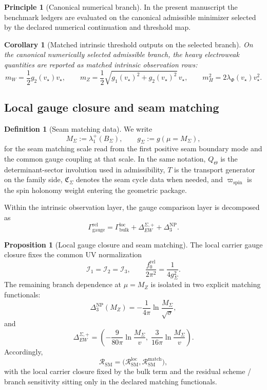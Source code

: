 \documentclass[11pt,a4paper]{article}
\newtheorem{corollary}[theorem]{Corollary}
\theoremstyle{definition}
\newtheorem{definition}[theorem]{Definition}
\newtheorem{proposition}[theorem]{Proposition}
\newtheorem{principle}[theorem]{Principle}
\theoremstyle{remark}
\newcommand{\Seam}{\Sigma}
\newcommand{\SM}{\mathrm{SM}}
\newcommand{\wspin}{\varpi_{\mathrm{spin}}}
\begin{document}
\begin{principle}[Canonical numerical branch]
In the present manuscript the benchmark ledgers are evaluated on the canonical admissible
minimizer selected by the declared numerical continuation and threshold map.
\end{principle}

\begin{corollary}[Matched intrinsic threshold outputs on the selected branch]
\label{cor:intrinsic-threshold-outputs}
On the canonical numerically selected admissible branch, the heavy electroweak quantities are
reported as matched intrinsic observation rows:
\[
m_W=\frac12 g_2(v_\star)v_\star,
\qquad
m_Z=\frac12\sqrt{g_1(v_\star)^2+g_2(v_\star)^2}\,v_\star,
\qquad
m_H^2=2\lambda_\Phi(v_\star)v_\star^2.
\]
\end{corollary}

\subsection{Local gauge closure and seam matching}

\begin{definition}[Seam matching data]
We write
\[
M_\Sigma:=\lambda_1^+(B_\Sigma),
\qquad
g_\Sigma:=g(\mu=M_\Sigma),
\]
for the seam matching scale read from the first positive seam boundary mode and the common gauge coupling at that scale. In the same notation, $Q_\Theta$ is the determinant-sector involution used in admissibility, $T$ is the transport generator on the family side, $\mathfrak C_\Sigma$ denotes the seam cycle data when needed, and $\wspin$ is the spin holonomy weight entering the geometric package.
\end{definition}

Within the intrinsic observation layer, the gauge comparison layer is decomposed as
\begin{equation}
\label{eq:relative-gauge-split}
\Gamma_{\mathrm{gauge}}^{\mathrm{rel}}
=
\Gamma_{\mathrm{bulk}}^{\mathrm{loc}}
+
\Delta_{EW}^{\Seam,+}
+
\Delta_3^{\mathrm{NP}}.
\end{equation}

\begin{proposition}[Local gauge closure and seam matching]
\label{prop:local-gauge-closure-matching}
The local carrier gauge closure fixes the common UV normalization
\[
\mathcal I_1=\mathcal I_2=\mathcal I_3,
\qquad
\frac{f_0^{\mathrm{rel}}}{2\pi^2}=\frac{1}{4g_\Seam^2}.
\]
The remaining branch dependence at $\mu=M_Z$ is isolated in two explicit matching functionals:
\[
\Delta_3^{\mathrm{NP}}(M_Z)
=
-\frac{1}{4\pi}\ln\frac{M_\Seam}{\sqrt{\sigma}},
\]
and
\[
\Delta_{EW}^{\Seam,+}
=
\left(
-\frac{9}{80\pi}\ln\frac{M_\Seam}{v},
\;
\frac{3}{16\pi}\ln\frac{M_\Seam}{v}
\right).
\]
Accordingly,
\[
\mathcal R_{\SM}
=
\bigl(\mathcal R_{\SM}^{\mathrm{loc}},\mathcal R_{\SM}^{\mathrm{match}}\bigr),
\]
with the local carrier closure fixed by the bulk term and the residual scheme / branch sensitivity sitting only in the declared matching functionals.
\end{proposition}
\end{document}
